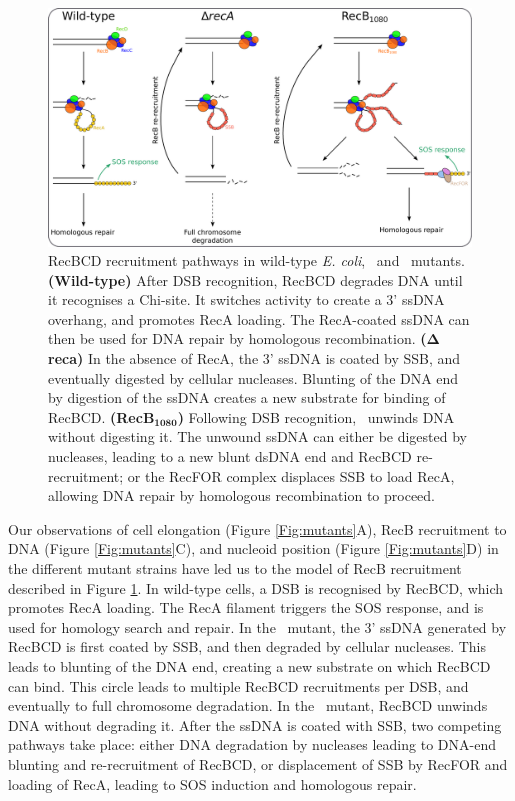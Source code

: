 \begin{figure}[htbp]
    \centering
    \includegraphics[width=\textwidth]{Figures/Fig_mutants_pathways.pdf}
    \caption{RecBCD recruitment pathways in wild-type \emph{E. coli}, \dreca\ and \geneteneighty\ mutants. \textbf{(Wild-type)} After DSB recognition, RecBCD degrades DNA until it recognises a Chi-site. It switches activity to create a 3' ssDNA overhang, and promotes RecA loading. The RecA-coated ssDNA can then be used for DNA repair by homologous recombination. \textbf{($\mathbf{\Delta}$reca)} In the absence of RecA, the 3' ssDNA is coated by SSB, and eventually digested by cellular nucleases. Blunting of the DNA end by digestion of the ssDNA creates a new substrate for binding of RecBCD. \textbf{(RecB$\mathbf{_{1080}}$)} Following DSB recognition, \teneighty\ unwinds DNA without digesting it. The unwound ssDNA can either be digested by nucleases, leading to a new blunt dsDNA end and RecBCD re-recruitment; or the RecFOR complex displaces SSB to load RecA, allowing DNA repair by homologous recombination to proceed.}
    \label{Fig:pathways}
\end{figure}

Our observations of cell elongation (Figure \ref{Fig:mutants}A), RecB recruitment to DNA (Figure \ref{Fig:mutants}C), and nucleoid position (Figure \ref{Fig:mutants}D) in the different mutant strains have led us to the model of RecB recruitment described in Figure \ref{Fig:pathways}. In wild-type cells, a DSB is recognised by RecBCD, which promotes RecA loading. The RecA filament triggers the SOS response, and is used for homology search and repair. In the \dreca\ mutant, the 3' ssDNA generated by RecBCD is first coated by SSB, and then degraded by cellular nucleases. This leads to blunting of the DNA end, creating a new substrate on which RecBCD can bind. This circle leads to multiple RecBCD recruitments per DSB, and eventually to full chromosome degradation. In the \geneteneighty\ mutant, RecBCD unwinds DNA without degrading it. After the ssDNA is coated with SSB, two competing pathways take place: either DNA degradation by nucleases leading to DNA-end blunting and re-recruitment of RecBCD, or displacement of SSB by RecFOR and loading of RecA, leading to SOS induction and homologous repair.

